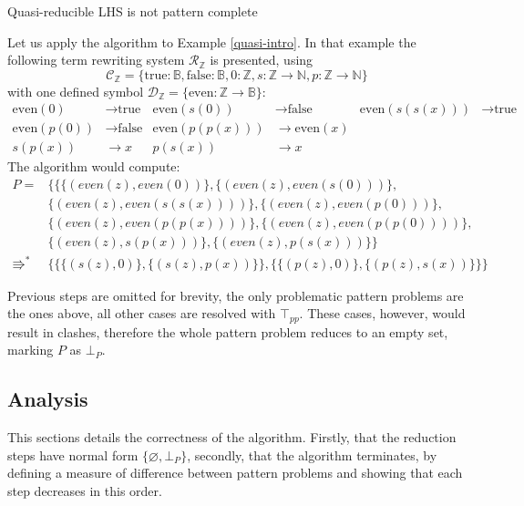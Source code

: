 \begin{example} Quasi-reducible LHS is not pattern complete \label{quasi-ex}

Let us apply the algorithm to Example \ref{quasi-intro}. In that example the following term rewriting system $\mathcal{R}_{\mathbb{Z}}$ is presented, using $$\mathcal{C}_{\mathbb{Z}} = \{\text{true}: \mathbb{B}, \text{false}: \mathbb{B}, 0: \mathbb{Z}, s: \mathbb{Z} \rightarrow \mathbb{N}, p: \mathbb{Z} \rightarrow \mathbb{N}\}$$ with one defined symbol $\mathcal{D}_{\mathbb{Z}} = \{\text{even}: \mathbb{Z} \rightarrow \mathbb{B}\}$:
\begin{align*}
    \text{even}(0) &\rightarrow \text{true} & \text{even}(s(0)) &\rightarrow \text{false} & \text{even}(s(s(x))) &\rightarrow \text{true} \\
    \text{even}(p(0)) &\rightarrow \text{false} &
    \text{even}(p(p(x))) &\rightarrow \text{even}(x) \\ 
    s(p(x)) &\rightarrow x & p(s(x)) &\rightarrow x
\end{align*}
The algorithm would compute:
\begin{align*}
    P = &\{\{\{(even(z), even(0))\}, \{(even(z), even(s(0)))\}, \\
    &\{(even(z), even(s(s(x))))\}, \{(even(z), even(p(0)))\}, \\
    &\{(even(z), even(p(p(x))))\}, \{(even(z), even(p(p(0))))\}, \\
    &\{(even(z), s(p(x)))\}, \{(even(z), p(s(x)))\}\} \\
    \Rrightarrow^{*} &\{\{\{(s(z), 0)\},  \{(s(z), p(x))\}\}, \{\{(p(z), 0)\},\{(p(z), s(x))\}\}\}
\end{align*}

Previous steps are omitted for brevity, the only problematic pattern problems are the ones above, all other cases are resolved with $\top_{pp}$. These cases, however, would result in clashes, therefore the whole pattern problem reduces to an empty set, marking $P$ as $\bot_{P}$.
\end{example}

\subsection{Analysis}
This sections details the correctness of the algorithm. Firstly, that the reduction steps have normal form $\{\varnothing, \bot_{P}\}$, secondly, that the algorithm terminates, by defining a measure of difference between pattern problems and showing that each step decreases in this order.


